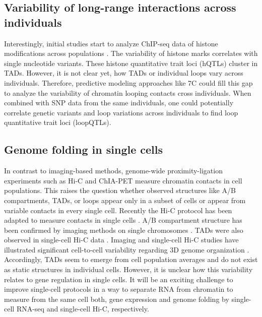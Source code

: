 \documentclass[a4paper,twoside=true,openright,parskip=full,chapterprefix=true,11pt,headings=normal,bibliography=totoc,listof=totoc,titlepage=on,captions=tableabove,draft=false]{scrreprt}
\theoremstyle{definition}
\theoremstyle{definition}
\theoremstyle{definition}
\theoremstyle{remark}
\begin{document}
\hypertarget{variability-of-long-range-interactions-across-individuals}{%
\subsection{Variability of long-range interactions across
individuals}\label{variability-of-long-range-interactions-across-individuals}}

Interestingly, initial studies start to analyze ChIP-seq data of histone
modifications across populations \citep{Grubert2015}. The variability of
histone marks correlates with single nucleotide variants. These histone
quantitative trait loci (hQTLs) cluster in TADs. However, it is not
clear yet, how TADs or individual loops vary across individuals.
Therefore, predictive modeling approaches like 7C could fill this gap to
analyze the variability of chromatin looping contacts cross individuals.
When combined with SNP data from the same individuals, one could
potentially correlate genetic variants and loop variations across
individuals to find loop quantitative trait loci (loopQTLs).

\hypertarget{genome-folding-in-single-cells}{%
\subsection{Genome folding in single
cells}\label{genome-folding-in-single-cells}}

In contrast to imaging-based methods, genome-wide proximity-ligation
experiments such as Hi-C and ChIA-PET measure chromatin contacts in cell
populations. This raises the question whether observed structures like
A/B compartments, TADs, or loops appear only in a subset of cells or
appear from variable contacts in every single cell. Recently the Hi-C
protocol has been adapted to measure contacts in single cells
\citep{Sekelja2016, Ulianov2017}. A/B compartment structure has been
confirmed by imaging methods on single chromosomes \citep{Wang2016d}.
TADs were also observed in single-cell Hi-C data \citep{Nagano2013}.
Imaging and single-cell Hi-C studies have illustrated significant
cell-to-cell variability regarding 3D genome organization
\citep{Nagano2013, Ramani2016, Flyamer2017, Stevens2017}. Accordingly,
TADs seem to emerge from cell population averages and do not exist as
static structures in individual cells. However, it is unclear how this
variability relates to gene regulation in single cells. It will be an
exciting challenge to improve single-cell protocols in a way to separate
RNA from chromatin to measure from the same cell both, gene expression
and genome folding by single-cell RNA-seq and single-cell Hi-C,
respectively.
\end{document}
